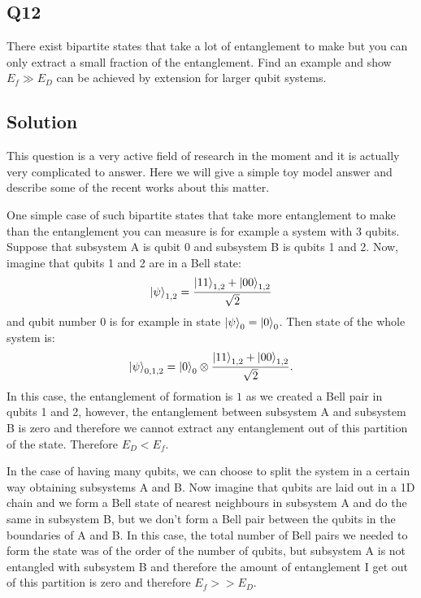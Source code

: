 \documentclass[12pt]{article}
\begin{document}
\begin{appendices}

\subsection*{Q12}
There exist bipartite states that take a lot of entanglement to make but you can only extract a small fraction of the entanglement. Find an example and show $E_f \gg E_D$ can be achieved by extension for larger qubit systems.
\subsection*{Solution}



This question is a very active field of research in the moment and it is actually very complicated to answer. Here we will give a simple toy model answer and describe some of the recent works about this matter.

 One simple case of such bipartite states that take more entanglement to make than the entanglement you can measure is for example a system with 3 qubits. Suppose that subsystem A is qubit 0 and subsystem B is qubits 1 and 2. Now, imagine that qubits 1 and 2 are in a Bell state:
 \begin{equation}
     \ket{\psi}_{1,2} = \frac{\ket{11}_{1,2}+\ket{00}_{1,2}}{\sqrt{2}}
 \end{equation}
 and qubit number 0 is for example in state $\ket{\psi}_{0} = \ket{0}_0$. Then state of the whole system is:
  \begin{equation}
     \ket{\psi}_{0,1,2} = \ket{0}_{0} \otimes \frac{\ket{11}_{1,2}+\ket{00}_{1,2}}{\sqrt{2}}.
 \end{equation}
 In this case, the entanglement of formation is $1$ as we created a Bell pair in qubits 1 and 2, however, the entanglement between subsystem A and subsystem B is zero and therefore we cannot extract any entanglement out of this partition of the state. Therefore $E_D<E_f$.
 
 In the case of having many qubits, we can choose to split the system in a certain way obtaining subsystems A and B. Now imagine that qubits are laid out in a 1D chain and we form a Bell state of nearest neighbours in subsystem A and do the same in subsystem B, but we don't form a Bell pair between the qubits in the boundaries of A and B. In this case, the total number of Bell pairs we needed to form the state was of the order of the number of qubits, but subsystem A is not entangled with subsystem B and therefore the amount of entanglement I get out of this partition is zero and therefore $E_f>>E_D$.


\end{appendices}
\end{document}
